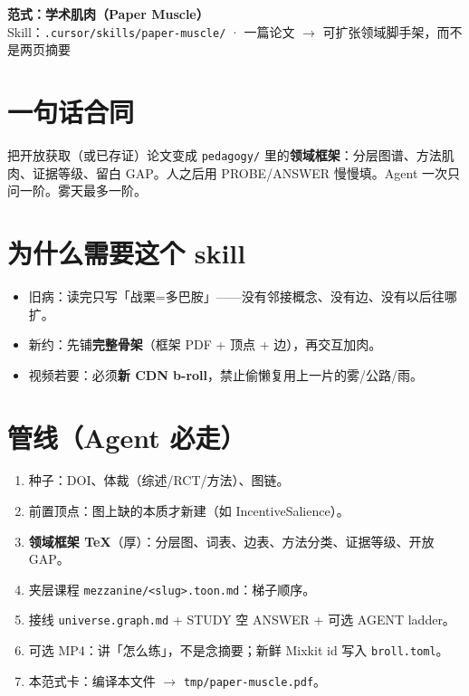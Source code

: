 \documentclass[11pt,a4paper]{ctexart}
\begin{document}
{\LARGE\color{accent}\textbf{范式：学术肌肉（Paper Muscle）}}\\[0.15em]
{\small\color{muted}Skill：\texttt{.cursor/skills/paper-muscle/} · 一篇论文 $\to$ 可扩张领域脚手架，而不是两页摘要}

\section{一句话合同}

把开放获取（或已存证）论文变成 \texttt{pedagogy/} 里的\textbf{领域框架}：分层图谱、方法肌肉、证据等级、留白 GAP。人之后用 PROBE/ANSWER 慢慢填。Agent 一次只问一阶。雾天最多一阶。

\section{为什么需要这个 skill}

\begin{itemize}
  \item 旧病：读完只写「战栗=多巴胺」——没有邻接概念、没有边、没有以后往哪扩。
  \item 新约：先铺\textbf{完整骨架}（框架 PDF + 顶点 + 边），再交互加肉。
  \item 视频若要：必须\textbf{新 CDN b-roll}，禁止偷懒复用上一片的雾/公路/雨。
\end{itemize}

\section{管线（Agent 必走）}

\begin{enumerate}
  \item 种子：DOI、体裁（综述/RCT/方法）、图链。
  \item 前置顶点：图上缺的本质才新建（如 IncentiveSalience）。
  \item \textbf{领域框架 TeX}（厚）：分层图、词表、边表、方法分类、证据等级、开放 GAP。
  \item 夹层课程 \texttt{mezzanine/<slug>.toon.md}：梯子顺序。
  \item 接线 \texttt{universe.graph.md} + STUDY 空 ANSWER + 可选 AGENT ladder。
  \item 可选 MP4：讲「怎么练」，不是念摘要；新鲜 Mixkit id 写入 \texttt{broll.toml}。
  \item 本范式卡：编译本文件 $\to$ \texttt{tmp/paper-muscle.pdf}。
\end{enumerate}
\end{document}

